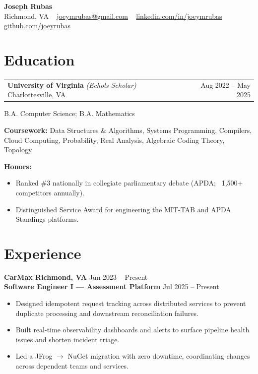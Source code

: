 \documentclass[11pt]{article}
\makeatletter
\newcommand{\NameSize}{18}
\newcommand{\NameLead}{20}
\newcommand{\NameWeight}{\bfseries}
\newcommand{\ContactSize}{10}
\newcommand{\ContactLead}{12}
\newcommand{\ContactSep}{\; \textbar\ \;}
\newcommand{\EmployerSize}{11}
\newcommand{\EmployerLead}{13}
\newcommand{\EmployerWeight}{\bfseries}
\newcommand{\EmployerPreSkip}{1pt}
\newcommand{\EmployerPostSkip}{-2pt}
\newcommand{\RoleTitleSize}{11}
\newcommand{\RoleTitleLead}{13}
\newcommand{\RoleTitleWeight}{\bfseries}
\newcommand{\RoleDateSize}{10}
\newcommand{\RoleDateLead}{12}
\newcommand{\RolePreSkip}{2pt}
\newcommand{\RolePostSkip}{-8pt}
\newcommand{\BulletSize}{10}
\newcommand{\BulletLead}{12}
\newenvironment{twocol}[2]{%
  \noindent\begin{tabular*}{\textwidth}{@{\extracolsep{\fill}} l r}
  #1 & #2\\
  \end{tabular*}\ignorespaces
}{\par}
\newcommand{\NameLine}[1]{%
  {\fontsize{\NameSize}{\NameLead}\selectfont \NameWeight #1}%
}
\newcommand{\ContactsLine}[1]{%
  {\fontsize{\ContactSize}{\ContactLead}\selectfont #1}%
}
\newcommand{\EmployerHeader}[2]{%
  \vspace*{\EmployerPreSkip}%
  \noindent
  {\fontsize{\EmployerSize}{\EmployerLead}\selectfont \EmployerWeight #1}%
  \hfill
  {\fontsize{\EmployerSize}{\EmployerLead}\selectfont #2}%
  \\[\EmployerPostSkip]%
}
\newcommand{\RoleHeader}[2]{%
  \vspace*{\RolePreSkip}%
  \noindent
  {\fontsize{\RoleTitleSize}{\RoleTitleLead}\selectfont \RoleTitleWeight #1}%
  \hfill
  {\fontsize{\RoleDateSize}{\RoleDateLead}\selectfont #2}%
  \\[\RolePostSkip]%
}
\newenvironment{ResumeItemize}{%
  \begin{itemize}\fontsize{\BulletSize}{\BulletLead}\selectfont
}{%
  \end{itemize}
}
\makeatother
\begin{document}
\pagestyle{empty}
\raggedbottom
\begin{center}
  \NameLine{Joseph Rubas}\\[2pt]
  \ContactsLine{%
    Richmond, VA \ContactSep
    \href{mailto:joeymrubas@gmail.com}{joeymrubas@gmail.com} \ContactSep
    \href{https://www.linkedin.com/in/joeymrubas/}{linkedin.com/in/joeymrubas} \ContactSep
    \href{https://github.com/joeyrubas}{github.com/joeyrubas}%
  }
\end{center}

\section{Education}
\begin{twocol}{\textbf{University of Virginia} \textit{(Echols Scholar)} \quad Charlottesville, VA}{Aug 2022 -- May 2025}\end{twocol}
B.A. Computer Science; B.A. Mathematics

\textbf{Coursework:}
Data Structures \& Algorithms, Systems Programming, Compilers, Cloud Computing, Probability, Real Analysis, Algebraic Coding Theory, Topology

\textbf{Honors:}
\begin{ResumeItemize}
  \item Ranked \#3 nationally in collegiate parliamentary debate (APDA; ~1,500+ competitors annually).
  \item Distinguished Service Award for engineering the MIT-TAB and APDA Standings platforms.
\end{ResumeItemize}

\section{Experience}

\EmployerHeader{CarMax \quad Richmond, VA}{Jun 2023 -- Present}
\RoleHeader{Software Engineer I — Assessment Platform}{Jul 2025 -- Present}
\begin{ResumeItemize}
  \item Designed idempotent request tracking across distributed services to prevent duplicate processing and downstream reconciliation failures.
  \item Built real-time observability dashboards and alerts to surface pipeline health issues and shorten incident triage.
  \item Led a JFrog $\rightarrow$ NuGet migration with zero downtime, coordinating changes across dependent teams and services.
\end{ResumeItemize}
\end{document}
